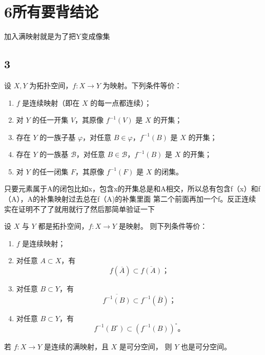 \chapter{6所有要背结论}
\begin{dxtips}
    加入满映射就是为了把Y变成像集
\end{dxtips}
\section{3}
\begin{theorem}[定理 3.1（连续性的等价刻画）]
设 $X,Y$ 为拓扑空间，$f:X\to Y$ 为映射。下列条件等价：
\begin{enumerate}
  \item $f$ 是连续映射（即在 $X$ 的每一点都连续）；
  \item 对 $Y$ 的任一开集 $V$，其原像 $f^{-1}(V)$ 是 $X$ 的开集；
  \item 存在 $Y$ 的一族子基 $\varphi$，对任意 $B\in\varphi$，$f^{-1}(B)$ 是 $X$ 的开集；
  \item 存在 $Y$ 的一族基 $\mathcal{B}$，对任意 $B\in\mathcal{B}$，$f^{-1}(B)$ 是 $X$ 的开集；
  \item 对 $Y$ 的任一闭集 $F$，其原像 $f^{-1}(F)$ 是 $X$ 的闭集。
\end{enumerate}
\end{theorem}
\begin{dxtips}
    只要元素属于A的闭包比如x，包含x的开集总是和A相交，所以总有包含f（x）和f（A），A的补集映射过去总在f（A)的补集里面
    第二个前面再加一个f。反正连续实在证明不了了就用就行了然后那简单验证一下
    
\end{dxtips}
\begin{theorem}[定理 3.2（连续映射补集逆的性质）]
设 $X$ 与 $Y$ 都是拓扑空间，$f:X\to Y$ 是映射。
则下列条件等价：
\begin{enumerate}
  \item $f$ 是连续映射；
  \item 对任意 $A\subset X$，有
  \[
  f(\overline{A})\subset \overline{f(A)}；
  \]
  \item 对任意 $B\subset Y$，有
  \[
  \overline{f^{-1}(B)}\subset f^{-1}(\overline{B})；
  \]
  \item 对任意 $B\subset Y$，有
  \[
  f^{-1}(B^\circ)\subset (f^{-1}(B))^\circ。
  \]
\end{enumerate}
\end{theorem}

\begin{theorem}[定理 3.8]
若 $f:X\to Y$ 是连续的满映射，且 $X$ 是可分空间，
则 $Y$ 也是可分空间。
\end{theorem}

